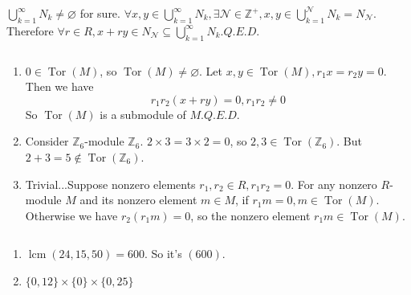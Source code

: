 \documentclass{article}
\newcommand{\textdots}{...}
\newcommand{\tmdummy}{$\mbox{}$}
\newcommand{\tmop}[1]{\ensuremath{\operatorname{#1}}}
\newcommand{\tmverbatim}[1]{\text{{\ttfamily{#1}}}}
\newenvironment{enumeratealpha}{\begin{enumerate}[a{\textup{)}}] }{\end{enumerate}}
\newenvironment{tmindent}{\begin{tmparmod}{1.5em}{0pt}{0pt}}{\end{tmparmod}}
\newenvironment{tmparmod}[3]{\begin{list}{}{\setlength{\topsep}{0pt}\setlength{\leftmargin}{#1}\setlength{\rightmargin}{#2}\setlength{\parindent}{#3}\setlength{\listparindent}{\parindent}\setlength{\itemindent}{\parindent}\setlength{\parsep}{\parskip}} \item[]}{\end{list}}
{\theorembodyfont{\rmfamily\small}\newtheorem{exercise}{Exercise}}
\begin{document}
\begin{exercise}
  {\tmdummy}
  
  \begin{tmindent}
    $\bigcup_{k = 1}^{\infty} N_k \neq \varnothing$ for sure. $\forall x, y
    \in \bigcup_{k = 1}^{\infty} N_k, \exists \mathcal{N} \in \mathbb{Z}^+, x,
    y \in \bigcup_{k = 1}^{\mathcal{N}} N_k = N_{\mathcal{N}}$. Therefore
    $\forall r \in R, x + ry \in N_{\mathcal{N}} \subseteq \bigcup_{k =
    1}^{\infty} N_k$.{\hspace*{\fill}}$Q.E.D.$
  \end{tmindent}
\end{exercise}

\begin{exercise}
  {\tmdummy}
  
  \begin{enumeratealpha}
    \item $0 \in \tmop{Tor} (M)$, so $\tmop{Tor} (M) \neq \varnothing$. Let
    $x, y \in \tmop{Tor} (M), r_1 x = r_2 y = 0$. Then we have
    \[ r_1 r_2  (x + ry) = 0, r_1 r_2 \neq 0 \]
    So $\tmop{Tor} (M)$ is a submodule of $M$.{\hspace*{\fill}}$Q.E.D.$
    
    \item Consider $\mathbb{Z}_6$-module $\mathbb{Z}_6$. $2 \times 3 = 3
    \times 2 = 0$, so $2, 3 \in \tmop{Tor} (\mathbb{Z}_6)$. But $2 + 3 = 5
    \notin \tmop{Tor} (\mathbb{Z}_6)$.
    
    \item Trivial{\textdots}Suppose nonzero elements $r_1, r_2 \in R, r_1 r_2
    = 0$. For any nonzero $R$-module $M$ and its nonzero element $m \in M$, if
    $r_1 m = 0, m \in \tmop{Tor} (M)$. Otherwise we have $r_2  (r_1 m) = 0$,
    so the nonzero element $r_1 m \in \tmop{Tor} (M)$.
  \end{enumeratealpha}
\end{exercise}

\begin{exercise}
  \tmverbatim{Trivial}
\end{exercise}

\begin{exercise}
  \tmverbatim{Trivial}
\end{exercise}

\begin{exercise}
  {\tmdummy}
  
  \begin{enumeratealpha}
    \item $\tmop{lcm} (24, 15, 50) = 600$. So it's $(600)$.
    
    \item $\{ 0, 12 \} \times \{ 0 \} \times \{ 0, 25 \}$
  \end{enumeratealpha}
\end{exercise}
\end{document}
